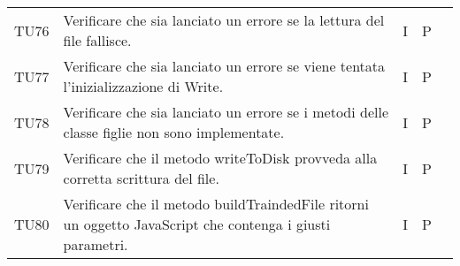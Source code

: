 \begin{longtable} {
		>{}p{15mm} 
		>{}p{79.5mm}
		>{}p{15mm} 
		>{}p{15mm}
		>{}p{0mm}}
	TU76		& Verificare che sia lanciato un errore se la lettura del file fallisce.& I & P &\TBstrut \\ [2mm]
	TU77		& Verificare che sia lanciato un errore se viene tentata l'inizializzazione di Write.& I & P &\TBstrut \\ [2mm]
	TU78		& Verificare che sia lanciato un errore se i metodi delle classe figlie non sono implementate.& I & P &\TBstrut \\ [2mm]
	TU79		& Verificare che il metodo writeToDisk provveda alla corretta scrittura del file.& I & P &\TBstrut \\ [2mm]
    TU80		& Verificare che il metodo buildTraindedFile ritorni un oggetto JavaScript che contenga i giusti parametri. & I & P &\TBstrut \\ [2mm]


\end{longtable}
